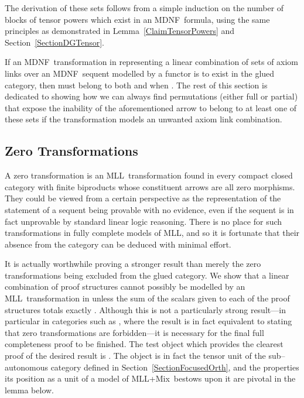 \documentclass{LMCS}
\theoremstyle{plain}\newtheorem*{cLm}{Claim}
\newcommand{\mll}{MLL} \newcommand{\mall}{MALL}
\newcommand{\mllmix}{MLL+Mix} \newcommand{\GRel}{\mathbf{GRel}}
\newcommand{\p}{} \newcommand{\N}{\mathbb{N}}
\begin{document}
\noindent The derivation of these sets follows from a simple induction on the number of blocks of tensor powers which exist in an MDNF~formula, using the same principles as demonstrated in Lemma~\ref{ClaimTensorPowers} and Section~\ref{SectionDGTensor}.

\p If an MDNF~transformation  in  representing a linear combination of sets of axiom links over an MDNF~sequent modelled by a functor  is to exist in the glued category, then  must belong to both  and  when . The rest of this section is dedicated to showing how we can always find permutations (either full or partial) that expose the inability of the aforementioned arrow to belong to at least one of these sets if the transformation models an unwanted axiom link combination.

\subsection{Zero Transformations} \label{SectionZeroTransProof}

A zero transformation is an \mll~transformation found in every compact closed category with finite biproducts whose constituent arrows are all zero morphisms. They could be viewed from a certain perspective as the representation of the statement of a sequent being provable with no evidence, even if the sequent is in fact unprovable by standard linear logic reasoning. There is no place for such transformations in fully complete models of \mll, and so it is fortunate that their absence from the category  can be deduced with minimal effort.

\p It is actually worthwhile proving a stronger result than merely the zero transformations being excluded from the glued category. We show that a linear combination of proof structures cannot possibly be modelled by an \mll~transformation in  unless the sum of the scalars given to each of the proof structures totals exactly . Although this is not a particularly strong result---in particular in categories such as , where the result is in fact equivalent to stating that zero transformations are forbidden---it is necessary for the final full completeness proof to be finished. The test object which provides the clearest proof of the desired result is . The object is in fact the tensor unit  of the sub--autonomous category  defined in Section~\ref{SectionFocusedOrth}, and the properties its position as a unit of a model of \mllmix\ bestows upon it are pivotal in the lemma below.
\end{document}
